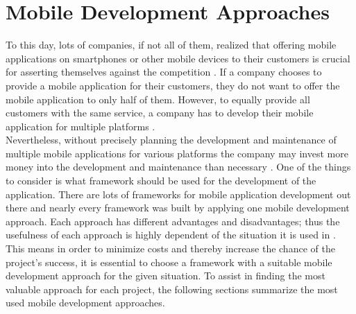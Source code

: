 \documentclass[Bachelor,BIF,english]{twbook}
\begin{document}
\newpage
\chapter{Mobile Development Approaches}
To this day, lots of companies, if not all of them, realized that offering mobile applications on smartphones or other mobile devices to their customers is crucial for asserting themselves against the competition \cite{7479278}. If a company chooses to provide a mobile application for their customers, they do not want to offer the mobile application to only half of them. However, to equally provide all customers with the same service, a company has to develop their mobile application for multiple platforms \cite[p.~5]{Steczko2016}.
\\[\baselineskip]
Nevertheless, without precisely planning the development and maintenance of multiple mobile applications for various platforms the company may invest more money into the development and maintenance than necessary \cite[p.~757]{Ciman2014} \cite[p.~1]{JohanssonSderberg2018} \cite[p.~8]{Steczko2016}. One of the things to consider is what framework should be used for the development of the application. There are lots of frameworks for mobile application development out there and nearly every framework was built by applying one mobile development approach. Each approach has different advantages and disadvantages; thus the usefulness of each approach is highly dependent of the situation it is used in \cite{7934674} \cite{6420693}. This means in order to minimize costs and thereby increase the chance of the project’s success, it is essential to choose a framework with a suitable mobile development approach for the given situation. To assist in finding the most valuable approach for each project, the following sections summarize the most used mobile development approaches. 
\end{document}
